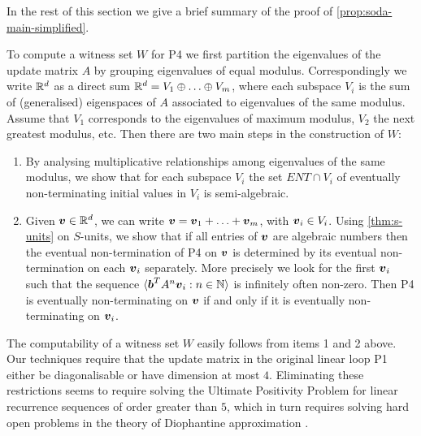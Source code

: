 In the rest of this section we give a brief summary of the proof of
\cref{prop:soda-main-simplified}.

To compute a witness set $W$ for \textsf{P4} we first partition the
eigenvalues of the update matrix $A$ by grouping eigenvalues of equal
modulus.  Correspondingly we write $\mathbb{R}^{d}$ as a direct sum
$\mathbb{R}^{d} = V_1 \oplus \ldots \oplus V_m$, where each subspace
$V_i$ is the sum of (generalised) eigenspaces of $A$ associated to
eigenvalues of the same modulus.  Assume that $V_1$ corresponds to the
eigenvalues of maximum modulus, $V_2$ the next greatest modulus,
etc.  Then there are two main steps in the construction of $W$:
\begin{enumerate}
\item
 By analysing multiplicative relationships among eigenvalues of the
 same modulus, we show that for each subspace $V_i$ the set
 $\mathit{ENT}\cap V_i$ of eventually non-terminating initial values
 in $V_i$ is semi-algebraic.
\item
Given $\boldsymbol{v} \in \mathbb{R}^{d}$, we can write
$\boldsymbol{v}=\boldsymbol{v}_1+\ldots+\boldsymbol{v}_m$, with
$\boldsymbol{v}_i \in V_i$.  Using \cref{thm:s-units} on
$S$-units, we show that if all entries of $\boldsymbol{v}$ are
algebraic numbers then the eventual non-termination of \textsf{P4} on
$\boldsymbol{v}$ is determined by its eventual non-termination on each
$\boldsymbol{v}_i$ separately.  More precisely we look for the first
$\boldsymbol{v}_i$ such that the sequence $\langle
\boldsymbol{b}^TA^n\boldsymbol{v}_i : n \in \mathbb{N}\rangle$ is infinitely often non-zero. Then \textsf{P4} is eventually non-terminating on
$\boldsymbol{v}$ if and only if it is eventually non-terminating on
$\boldsymbol{v}_i$.
\end{enumerate}

The computability of a witness set $W$ easily follows from items 1 and
2 above. Our techniques require that the update matrix in the
original linear loop \textsf{P1} either be diagonalisable or have
dimension at most $4$.  Eliminating these restrictions seems to
require solving the Ultimate Positivity Problem for linear recurrence
sequences of order greater than $5$, which in turn requires solving
hard open problems in the theory of Diophantine approximation
\cite{OW14:SODA}.
